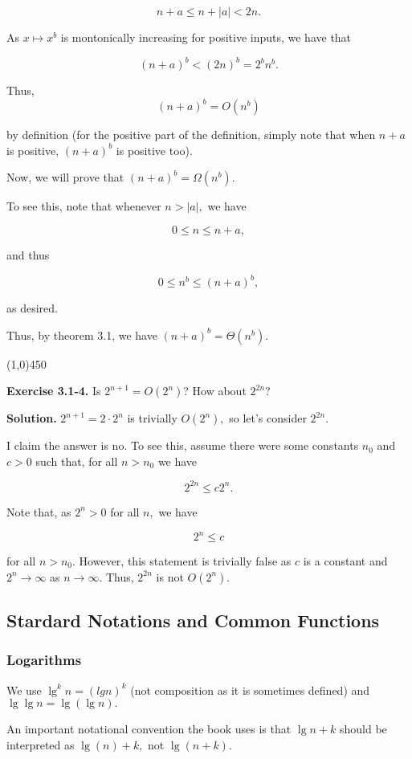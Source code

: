 \documentclass{article}
\newcommand{\exec}[2]
{\textbf{Exercise #1.} #2

\textbf{Solution.}}
\newcommand{\bardiv}{\begin{center}
\line(1,0){450}
\end{center}}
\begin{document}
$$n+a \leq n + |a| < 2n.$$

As $x \mapsto x^b$ is montonically increasing for positive inputs, we have that

$$(n+a)^b < (2n)^b = 2^b n^b.$$

Thus, $$(n+a)^b = O(n^b)$$

by definition (for the positive part of the definition, simply note that when $n+a$ is positive, $(n+a)^b$ is positive too).

Now, we will prove that $(n+a)^b = \Omega(n^b).$

To see this, note that whenever $n > |a|,$ we have

$$0 \leq n \leq n+a,$$

and thus

$$0 \leq n^b \leq (n+a)^b,$$

as desired.

Thus, by theorem 3.1, we have $(n+a)^b = \Theta(n^b).$

\bardiv

\exec{3.1-4}{Is $2^{n+1} = O(2^n)$? How about $2^{2n}$?}
$2^{n+1} = 2\cdot2^{n}$ is trivially $O(2^n),$ so let's consider $2^{2n}.$

I claim the answer is no. To see this, assume there were some constants $n_0$ and $c > 0$ such that, for all $n > n_0$ we have

$$2^{2n} \leq c2^{n}.$$

Note that, as $2^n > 0$ for all $n,$ we have

$$2^n \leq c$$

for all $n > n_0.$ However, this statement is trivially false as $c$ is a constant and $2^n \rightarrow \infty$ as $n \rightarrow\infty.$ Thus, $2^{2n}$ is not $O(2^n).$

\subsection{Stardard Notations and Common Functions}

\subsubsection{Logarithms}

We use $\lg^k n = (lg n)^k$ (not composition as it is sometimes defined) and $\lg \lg n = \lg(\lg n).$

An important notational convention the book uses is that $\lg n + k$ should be interpreted as $\lg(n) + k,$ not $\lg(n+k).$
\end{document}
